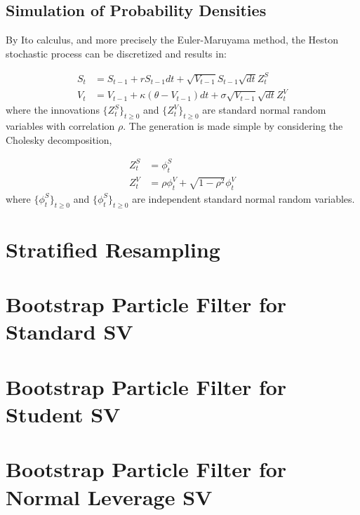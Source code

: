 \documentclass[11pt,a4,twosided,singlespacing,titlepagenumber=on]{scrreprt}
\numberwithin{equation}{chapter} %
\theoremstyle{remark}
\begin{document}
\subsection{Simulation of Probability Densities}
By Ito calculus, and more precisely the Euler-Maruyama method, the Heston stochastic process can be discretized and results in:

\begin{align*}
S_t &= S_{t-1} + r S_{t-1} dt + \sqrt{V_{t-1}}S_{t-1} \sqrt{dt}Z_t^S \\
V_t &= V_{t-1} + \kappa(\theta - V_{t-1})dt + \sigma \sqrt{V_{t-1}} \sqrt{dt} Z_t^V
\end{align*}
where the innovations $\{Z_t^S\}_{t \geq 0}$ and $\{Z_t^V\}_{t \geq 0}$ are standard normal random variables with correlation $\rho$. The generation is made simple by considering the Cholesky decomposition,

\begin{align*}
Z_t^S &= \phi_t^S \\
Z_t^V &= \rho \phi_t^V + \sqrt{1-\rho^2} \phi_t^V
\end{align*}
where $\{\phi_t^S\}_{t \geq 0}$ and $\{\phi_t^S\}_{t \geq 0}$ are independent standard normal random variables.

\section{Stratified Resampling}


\section{Bootstrap Particle Filter for Standard SV}


\section{Bootstrap Particle Filter for Student SV}


\section{Bootstrap Particle Filter for Normal Leverage SV}

\end{document}

